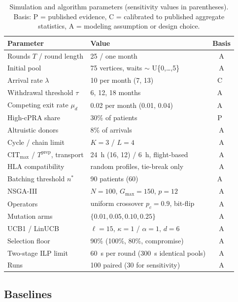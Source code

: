 \documentclass[journal]{IEEEtran}
\newcommand{\cit}{\ensuremath{\mathrm{CIT}}}
\begin{document}
\begin{table}[!htbp]
\centering
\caption{Simulation and algorithm parameters (sensitivity values in
parentheses). Basis: P = published evidence, C = calibrated to
published aggregate statistics, A = modeling assumption or design
choice.}
\label{tab:params}
\footnotesize
\setlength{\tabcolsep}{3pt}
\begin{tabular}{@{}p{3.0cm}p{4.0cm}c@{}}
\toprule
Parameter & Value & Basis \\
\midrule
Rounds $T$ / round length & 25 / one month & A \\
Initial pool & 75 vertices, waits $\sim$ U\{0,\dots,5\} & A \\
Arrival rate $\lambda$ & 10 per month (7, 13) & C~\cite{ANZKX2021,DonateLife2024} \\
Withdrawal threshold $\tau$ & 6, 12, 18 months & A~\cite{Ferrari2012} \\
Competing exit rate $\mu_d$ & 0.02 per month (0.01, 0.04) & A~\cite{DonateLife2024} \\
High-cPRA share & 30\% of patients & P~\cite{ANZDATA2026} \\
Altruistic donors & 8\% of arrivals & A \\
Cycle / chain limit & $K = 3$ / $L = 4$ & A \\
$\cit_{\max}$ / $T^{\mathrm{prep}}$, transport & 24~h (16, 12) / 6~h, flight-based & A \\
HLA compatibility & random profiles, tie-break only & A \\
Batching threshold $n^*$ & 90 patients (60) & A~\cite{ANZKX2021} \\
NSGA-III & $N = 100$, $G_{\max} = 150$, $p = 12$ & A \\
Operators & uniform crossover $p_c = 0.9$, bit-flip & A \\
Mutation arms & $\{0.01, 0.05, 0.10, 0.25\}$ & A \\
UCB1 / LinUCB & $\ell = 15$, $\kappa = 1$ / $\alpha = 1$, $d = 6$ & A \\
Selection floor & 90\% (100\%, 80\%, compromise) & A \\
Two-stage ILP limit & 60~s per round (300~s identical pools) & A \\
Runs & 100 paired (30 for sensitivity) & A \\
\bottomrule
\end{tabular}
\end{table}

\subsection{Baselines}
\label{sec:exp:baselines}
\end{document}
